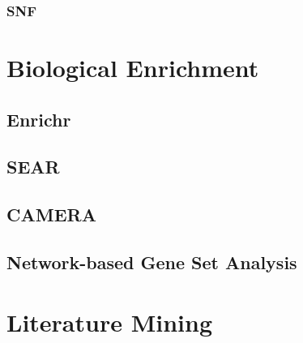 \documentclass[]{book}
\begin{document}
\subsection{SNF}\label{snf}

\chapter{Biological Enrichment}\label{bio-enrichment}

\section{Enrichr}\label{enrichr}

\section{SEAR}\label{sear}

\section{CAMERA}\label{camera}

\section{Network-based Gene Set
Analysis}\label{network-based-gene-set-analysis}

\chapter{Literature Mining}\label{lit}


\end{document}
